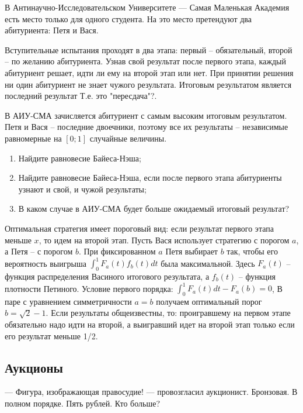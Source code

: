 \begin{problem}
В Антинаучно-Исследовательском Университете — Самая Маленькая Академия есть место только для одного студента. На это место претендуют два абитуриента: Петя и Вася.

Вступительные испытания проходят в два этапа: первый -- обязательный, второй -- по желанию абитуриента. Узнав свой результат после первого этапа, каждый абитуриент решает, идти ли ему на второй этап или нет. При принятии решения ни один абитуриент не знает чужого результата. Итоговым результатом является последний результат {\red Т.е. это "пересдача"?}.

В АИУ-СМА зачисляется абитуриент с самым высоким итоговым результатом. Петя и Вася -- последние двоечники, поэтому все их результаты -- независимые равномерные на $[0;1]$ случайные величины.

\begin{enumerate}
\item Найдите равновесие Байеса-Нэша;
\item Найдите равновесие Байеса-Нэша, если после первого этапа абитуриенты узнают и свой, и чужой результаты;
\item В каком случае в АИУ-СМА будет больше ожидаемый итоговый результат?
\end{enumerate}




\begin{sol}
Оптимальная стратегия имеет пороговый вид: если результат первого этапа меньше $x$, то идем на второй этап. Пусть Вася использует стратегию с порогом $a$, а Петя -- с порогом $b$. При фиксированном $a$ Петя выбирает $b$ так, чтобы его вероятность выигрыша $\int_{0}^{1}F_{a}(t)f_{b}(t)dt$ была максимальной. Здесь $F_{a}(t)$ -- функция распределения Васиного итогового результата, а $f_{b}(t)$ -- функция плотности Петиного. Условие первого порядка: $\int_{0}^{1}F_{a}(t)dt-F_{a}(b)=0$,  В паре с уравнением симметричности $a=b$ получаем оптимальный порог $b=\sqrt{2}-1$. Если результаты общеизвестны, то: проигравшему на первом этапе обязательно надо идти на второй, а выигравший идет на второй этап только если его результат меньше 1/2.
\end{sol}
\end{problem}



\subsection{Аукционы}
\begin{rem}
— Фигура, изображающая правосудие! — провозгласил аукционист. Бронзовая. В полном порядке. Пять рублей. Кто больше?
\end{rem}


